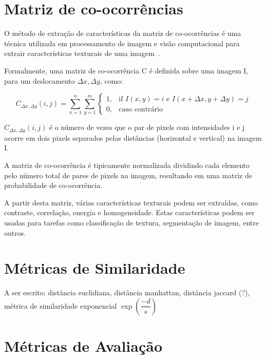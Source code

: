 \section{Matriz de co-ocorrências}\label{sec:teorica-matriz-co-ocorrencia}

O método de extração de características da matriz de co-ocorrências é
uma técnica utilizada em processamento de imagem e visão computacional
para extrair características texturais de uma imagem~\cite{matrizcoocorrencia2017}.

Formalmente, uma matriz de co-ocorrência C é definida sobre uma imagem
I, para um deslocamento $\Delta x, \Delta y$, como:

\begin{equation}
C_{\Delta x, \Delta y}(i,j)=\sum_{x=1}^n\sum_{y=1}^m\begin{cases} 1, & \text{if }I(x,
                                                       y)=i\text{ e
                                                       }I(x+\Delta x, y+\Delta
                                                       y)=j \\ 0, &
                                                                    \text{caso contrário}\end{cases}
\end{equation}

$C_{\Delta x, \Delta y}(i,j)$ é o número de vezes que o par de pixels com
intensidades i e j ocorre em dois pixels separados pelas distâncias
(horizontal e vertical) na imagem I.

A matriz de co-ocorrência é tipicamente normalizada dividindo cada
elemento pelo número total de pares de pixels na imagem, resultando em
uma matriz de probabilidade de co-ocorrência.

A partir desta matriz, várias características texturais podem ser
extraídas, como contraste, correlação, energia e homogeneidade. Estas
características podem ser usadas para tarefas como classificação de
textura, segmentação de imagem, entre outros.


\section{Métricas de Similaridade}\label{sec:teorica-metricas-de-similaridade}

A ser escrito: distância euclidiana, distância manhattan, distância
jaccard (?), métrica de similaridade exponencial $\exp(\dfrac{-d}{s})$

\section{Métricas de Avaliação}

